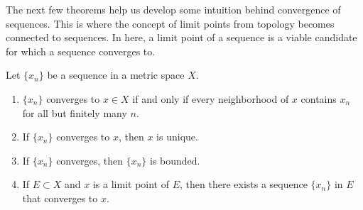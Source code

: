   The next few theorems help us develop some intuition behind convergence of sequences. This is where the concept of limit points from topology becomes connected to sequences. In here, a limit point of a sequence is a viable candidate for which a sequence converges to. 

  \begin{theorem}
    Let $\{x_n\}$ be a sequence in a metric space $X$. 
    \begin{enumerate}
      \item $\{x_n\}$ converges to $x \in X$ if and only if every neighborhood of $x$ contains $x_n$ for all but finitely many $n$. 
      \item If $\{x_n\}$ converges to $x$, then $x$ is unique. 
      \item If $\{x_n\}$ converges, then $\{x_n\}$ is bounded. 
      \item If $E \subset X$ and $x$ is a limit point of $E$, then there exists a sequence $\{x_n\}$ in $E$ that converges to $x$. 
    \end{enumerate}
  \end{theorem}
